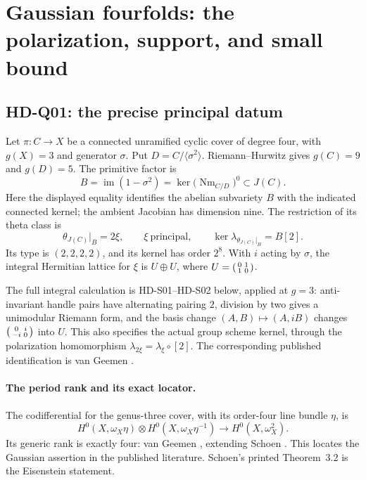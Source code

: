\section{Gaussian fourfolds: the polarization, support, and small bound}
\label{sec:gaussian}

\subsection{HD-Q01: the precise principal datum}
Let $\pi:C\to X$ be a connected unramified cyclic cover of degree four, with $g(X)=3$ and generator $\sigma$. Put $D=C/\langle\sigma^2\rangle$. Riemann--Hurwitz gives $g(C)=9$ and $g(D)=5$. The primitive factor is
\[
 B=\operatorname{im}(1-\sigma^2)
  =\ker\bigl(\operatorname{Nm}_{C/D}\bigr)^0\subset J(C).
\]
Here the displayed equality identifies the abelian subvariety $B$ with the indicated connected kernel; the ambient Jacobian has dimension nine. The restriction of its theta class is
\[
 \theta_{J(C)}|_B=2\xi,\qquad
 \xi\ \text{principal},\qquad
 \ker\lambda_{\theta_{J(C)}|_B}=B[2].
\]
Its type is $(2,2,2,2)$, and its kernel has order $2^8$. With $i$ acting by $\sigma$, the integral Hermitian lattice for $\xi$ is $U\oplus U$, where $U=\begin{psmallmatrix}0&1\\1&0\end{psmallmatrix}$.

The full integral calculation is HD-S01--HD-S02 below, applied at $g=3$: anti-invariant handle pairs have alternating pairing $2$, division by two gives a unimodular Riemann form, and the basis change $(A,B)\mapsto(A,iB)$ changes $\begin{psmallmatrix}0&i\\-i&0\end{psmallmatrix}$ into $U$. This also specifies the actual group scheme kernel, through the polarization homomorphism $\lambda_{2\xi}=\lambda_\xi\circ[2]$. The corresponding published identification is van Geemen \cite[Theorem~5.3(1)--(2), pp.~629--630]{vG96}.

\paragraph{The period rank and its exact locator.}
The codifferential for the genus-three cover, with its order-four line bundle $\eta$, is
\[
 H^0(X,\omega_X\eta)\otimes H^0(X,\omega_X\eta^{-1})
   \longrightarrow H^0(X,\omega_X^2).
\]
Its generic rank is exactly four: van Geemen \cite[Theorem~5.3(3) and its proof, pp.~629--630]{vG96}, extending Schoen \cite[Lemma~3.11 and the ensuing pencil calculation, pp.~29--30]{Schoen88}. This locates the Gaussian assertion in the published literature. Schoen's printed Theorem~3.2 is the Eisenstein statement.

